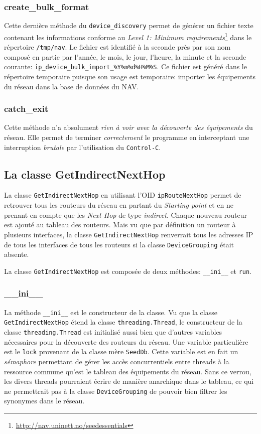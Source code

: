 \subsubsection{create\_bulk\_format\\}
Cette dernière méthode du \texttt{device\_discovery} permet de générer un fichier texte contenant les informations conforme au  \emph{Level 1: Minimum requirements}\footnote{\url{http://nav.uninett.no/seedessentials}} dans le répertoire \texttt{/tmp/nav}. Le fichier est identifié à la seconde près par son nom composé en partie par l'année, le mois, le jour, l'heure, la minute et la seconde courante: \texttt{ip\_device\_bulk\_import\_\%Y\%m\%d\%H\%M\%S}. Ce fichier est généré dans le répertoire temporaire puisque son usage est temporaire: importer les équipements du réseau dans la base de données du NAV. 

\subsubsection{catch\_exit}
Cette méthode n'a absolument \emph{rien à voir avec la découverte des équipements} du réseau. Elle permet de terminer \emph{correctement} le programme en interceptant une interruption \emph{brutale} par l'utilisation du \texttt{Control-C}.


\subsection{La classe GetIndirectNextHop}
La classe \texttt{GetIndirectNextHop} en utilisant l'OID \texttt{ipRouteNextHop} permet de retrouver tous les routeurs du réseau en partant du \emph{Starting point} et en ne prenant en compte que les \emph{Next Hop} de type \emph{indirect}. Chaque nouveau routeur est ajouté au tableau des routeurs. Mais vu que par définition un routeur à plusieurs interfaces, la classe \texttt{GetIndirectNextHop} renverrait tous les adresses IP de tous les interfaces de tous les routeurs si la classe \texttt{DeviceGrouping} était absente.

La classe \texttt{GetIndirectNextHop} est composée de deux méthodes: \texttt{\_\_ini\_\_} et \texttt{run}.

\subsubsection{\_\_ini\_\_}
La méthode  \texttt{\_\_ini\_\_} est le constructeur de la classe. Vu que la classe \texttt{GetIndirectNextHop} étend la classe \texttt{threading.Thread}, le constructeur de la classe \texttt{threading.Thread} est initialisé aussi bien que d'autres variables nécessaires pour la découverte des routeurs du réseau.  Une variable particulière est le \texttt{lock} provenant de la classe mère \texttt{SeedDb}. Cette variable est en fait un \emph{sémaphore} permettant de gérer les accès concurrentiels entre threads à la ressource commune qu'est le tableau des équipements du réseau. Sans ce verrou, les divers threads pourraient écrire de manière anarchique dans le tableau, ce qui ne permettrait pas à la classe \texttt{DeviceGrouping} de pouvoir bien filtrer les synonymes dans le réseau.


